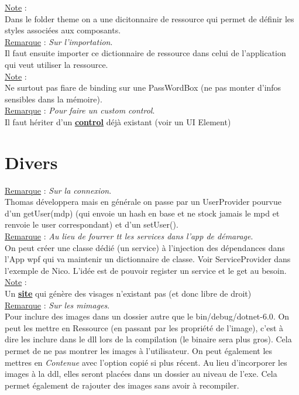 \documentclass[a4paper,12pt,twoside]{article}
\newcommand{\urlcolor}{magenta}  %
\newcommand{\keycolor}{purple} %
\newcommand{\incode}[1]{{\footnotesize\ttfamily #1}} %
\newcommand{\rem}[2]{\noindent\underline{Remarque} : \textit{#1}.\\ \indent #2}
\newcommand{\note}[1]{\noindent\underline{Note} : \\ \indent #1}
\newcommand{\keyref}[2]{\hypersetup{urlcolor=\keycolor} \href{#1}{\textbf{#2}}\hypersetup{urlcolor=\urlcolor}}
\begin{document}
\note{Dans le folder theme on a une dicitonnaire de ressource qui permet de définir les styles associées aux composants.}\\

\rem{Sur l'importation}{Il faut ensuite importer ce dictionnaire de ressource dans celui de l'application qui veut utiliser la ressource.}\\

\note{Ne surtout pas fiare de binding sur une \incode{PassWordBox} (ne pas monter d'infos sensibles dans la mémoire).}\\

\rem{Pour faire un custom control}{Il faut hériter d'un \keyref{https://docs.microsoft.com/en-us/dotnet/api/system.windows.controls.control?view=windowsdesktop-6.0}{control} déjà existant (voir un UI Element)}\\

\section{Divers}

\rem{Sur la connexion}{Thomas développera mais en générale on passe par un UserProvider pourvue d'un getUser(mdp) (qui envoie un hash en base et ne stock jamais le mpd et renvoie le user correspondant) et d'un setUser().}\\

\rem{Au lieu de fourrer tt les services dans l'app de démarage}{On peut créer une classe dédié (un service) à l'injection des dépendances dans l'App wpf qui va maintenir un dictionnaire de classe. Voir ServiceProvider dans l'exemple de Nico. L'idée est de pouvoir register un service et le get au besoin.}\\

\note{Un \keyref{https://this-person-does-not-exist.com/en}{site} qui génère des visages n'existant pas (et donc libre de droit)}\\

\rem{Sur les mimages}{Pour inclure des images dans un dossier autre que le \incode{bin/debug/dotnet-6.0}. On peut les mettre en Ressource (en passant par les propriété de l'image), c'est à dire les inclure dans le dll lors de la compilation (le binaire sera plus gros). Cela permet de ne pas montrer les images à l'utilisateur. On peut également les mettres en \textit{Contenue} avec l'option copié si plus récent. Au lieu d'incorporer les images à la ddl, elles seront placées dans un dossier au niveau de l'exe. Cela permet également de rajouter des images sans avoir à recompiler.}\\
\end{document}
